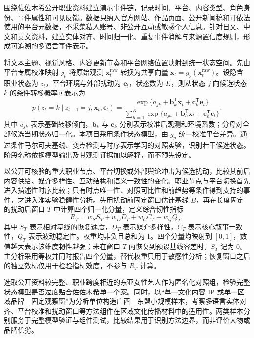 \GXNSFBodyText


围绕佐佐木希公开职业资料建立演示事件链，记录时间、平台、内容类型、角色身份、事件属性和可见反馈。数据只纳入官方网站、作品页面、公开新闻稿和可依法使用的平台元数据，不采集私人账号、非公开互动或敏感个人信息。针对日文、中文和英文资料，建立实体对齐、时间归一化、重复事件消解与来源置信度规则，形成可追溯的多语言事件表示。

将文本主题、视觉风格、内容更新节奏和平台网络位置映射到统一状态空间。先由平台专属校准映射 $g_p$ 将原始观测 $\bm{x}_t^{\mathrm{raw}}$ 转换为共享向量 $\bm{x}_t=g_p(\bm{x}_t^{\mathrm{raw}})$。设隐含职业状态为 $z_t$，平台环境与外部扰动为 $\bm{e}_t$，状态数为 $K$，则从状态 $j$ 向候选状态 $k$ 的条件转移概率可表示为
\begin{equation}
  p(z_t=k\mid z_{t-1}=j,\bm{x}_t,\bm{e}_t)=
  \frac{\exp\{a_{jk}+\bm{b}_k^{\mathsf T}\bm{x}_t+\bm{c}_k^{\mathsf T}\bm{e}_t\}}
  {\sum_{h=1}^{K}\exp\{a_{jh}+\bm{b}_h^{\mathsf T}\bm{x}_t+\bm{c}_h^{\mathsf T}\bm{e}_t\}}.
  \label{eq:gx-state-transition}
\end{equation}
其中 $a_{jk}$ 表示基础转移倾向，$\bm{b}_k$ 与 $\bm{c}_k$ 分别表示校准后观测和环境系数；分母对全部候选当期状态归一化。本项目采用条件状态模型，由 $g_p$ 统一校准平台差异。通过条件马尔可夫基线、变点检测与时序表示学习的对照实验，识别若干候选状态。阶段名称依据模型输出及其观测证据加以解释，而不预先设定。

以公开可核验的重大职业节点、平台切换或外部舆论冲击为候选扰动，比较其前后内容供给、媒介多样性、互动结构和语义一致性的变化。职业节点与平台切换首先进入描述性时序比较；只有时点唯一性、对照可比性和前趋势等条件得到支持的事件，才进入准实验稳健性分析。先用扰动前固定窗口估计基线 $B$，再在长度固定的扰动后窗口 $T$ 中计算四个归一化分量，定义综合韧性指标
\begin{equation}
  R_T=w_S S_T+w_D D_T+w_C C_T+w_Q Q_T,
  \label{eq:gx-resilience}
\end{equation}
其中 $S_T$ 表示相对基线的恢复速度，$D_T$ 表示媒介多样性，$C_T$ 表示核心叙事一致性，$Q_T$ 表示波动稳定性。权重均非负且总和为 1。四个分量均映射到 $[0,1]$，数值越大表示该维度韧性越强；未在窗口 $T$ 内恢复到预设基线容差时，$S_T$ 记为 0。主分析采用等权并同时报告四个分量，替代权重只用于敏感性分析；恢复窗口之后的独立效标仅用于检验指标效度，不参与 $R_T$ 计算。

选取公开资料较完整、职业跨度相近的东亚女性艺人作为匿名化对照组，检验完整状态模型是否过度贴合佐佐木希单一个案。同时，以“单一文化内容 IP 或单一区域品牌—固定观察窗”为分析单位构造广西—东盟小规模样本，考察多语言实体对齐、平台校准和扰动窗口等方法组件在区域文化传播材料中的适用性。两类样本分别服务于完整模型验证与组件测试，比较结果用于识别方法边界，而非评价人物或品牌优劣。

